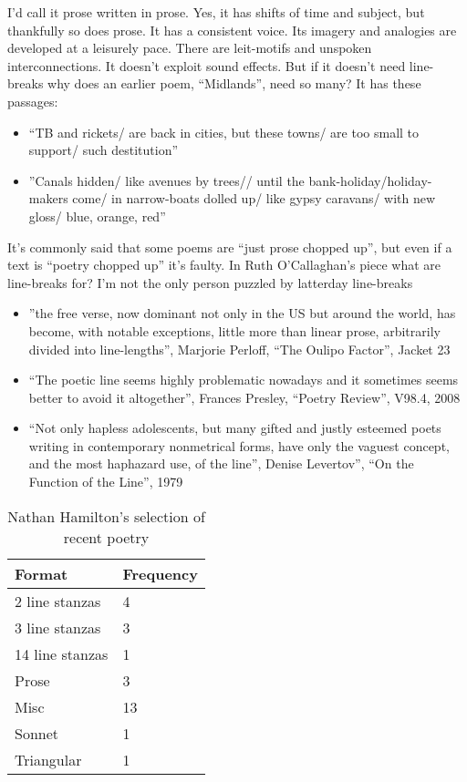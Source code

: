 \documentclass[11pt]{article}
\begin{document}
I'd call it prose written in prose. Yes, it has shifts of time and subject, but thankfully so does prose. It has a consistent voice. Its imagery and analogies are developed at a leisurely pace. There are leit-motifs and unspoken interconnections. It doesn't exploit sound effects. But if it doesn't need line-breaks why does an earlier poem, ``Midlands'', need so many? It has these passages: 

\begin{itemize}
\item  ``TB and rickets/ are back in cities, but these towns/ are too small to support/ such destitution''
\item ''Canals hidden/ like avenues by trees// until the bank-holiday/holiday-makers come/ in narrow-boats dolled up/ like gypsy caravans/ with new gloss/ blue, orange, red''
\end{itemize}


It's commonly said that some poems are ``just prose chopped up'', but even if a text is ``poetry chopped up'' it's faulty. In Ruth O'Callaghan's piece what are line-breaks for? I'm not the only person puzzled by latterday line-breaks
\begin{itemize}
\item ''the free verse, now dominant not only in the US but around the world, has become, with notable exceptions, little more than linear prose, arbitrarily divided into line-lengths'', Marjorie Perloff, ``The Oulipo Factor'', Jacket 23
\item  ``The poetic line seems highly problematic nowadays and it sometimes seems better to avoid it altogether'', Frances Presley, ``Poetry Review'', V98.4, 2008
\item  ``Not only hapless adolescents, but many gifted and justly esteemed poets writing in contemporary nonmetrical forms, have only the vaguest concept, and the most haphazard use, of the line'', Denise Levertov'', ``On the Function of the Line'', 1979
\end{itemize}

\begin{table}[htbp]
\centering
\begin{tabular}{|l|l|}\hline
\textbf{Format} & \textbf{Frequency}\\\hline
2 line stanzas & 4\\
3 line stanzas & 3\\
14 line stanzas & 1\\
Prose & 3\\
Misc & 13\\
Sonnet & 1\\
Triangular & 1\\\hline
\end{tabular}
\caption{Nathan Hamilton's selection of recent poetry}
\end{table}
\end{document}
